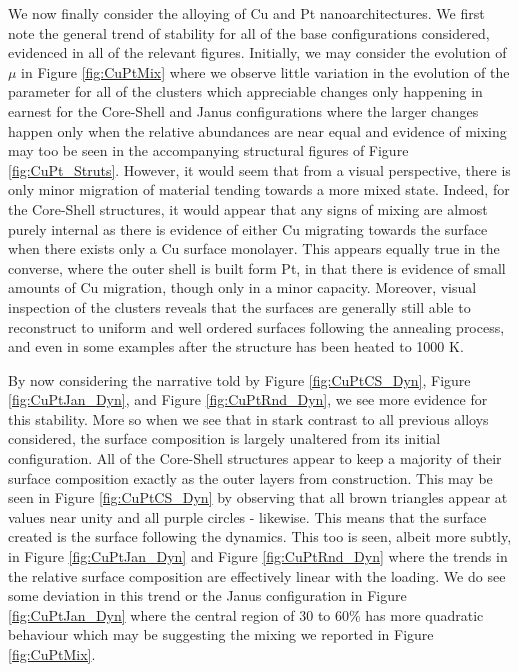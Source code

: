 We now finally consider the alloying of Cu and Pt nanoarchitectures. We first note the general trend of stability for all of the base configurations considered, evidenced in all of the relevant figures. Initially, we may consider the evolution of $\mu$ in Figure \ref{fig:CuPtMix} where we observe little variation in the evolution of the parameter for all of the clusters which appreciable changes only happening in earnest for the Core-Shell and Janus configurations where the larger changes happen only when the relative abundances are near equal and evidence of mixing may too be seen in the accompanying structural figures of Figure \ref{fig:CuPt_Struts}. However, it would seem that from a visual perspective, there is only minor migration of material tending towards a more mixed state. Indeed, for the Core-Shell structures, it would appear that any signs of mixing are almost purely internal as there is evidence of either Cu migrating towards the surface when there exists only a Cu surface monolayer. This appears equally true in the converse, where the outer shell is built form Pt, in that there is evidence of small amounts of Cu migration, though only in a minor capacity. Moreover, visual inspection of the clusters reveals that the surfaces are generally still able to reconstruct to uniform and well ordered surfaces following the annealing process, and even in some examples after the structure has been heated to 1000 K. 

By now considering the narrative told by Figure \ref{fig:CuPtCS_Dyn}, Figure \ref{fig:CuPtJan_Dyn}, and Figure \ref{fig:CuPtRnd_Dyn}, we see more evidence for this stability. More so when we see that in stark contrast to all previous alloys considered, the surface composition is largely unaltered from its initial configuration. All of the Core-Shell structures appear to keep a majority of their surface composition exactly as the outer layers from construction. This may be seen in Figure \ref{fig:CuPtCS_Dyn} by observing that all brown triangles appear at values near unity and all purple circles - likewise. This means that the surface created is the surface following the dynamics. This too is seen, albeit more subtly, in Figure \ref{fig:CuPtJan_Dyn} and Figure \ref{fig:CuPtRnd_Dyn} where the trends in the relative surface composition are effectively linear with the loading. We do see some deviation in this trend or the Janus configuration in Figure \ref{fig:CuPtJan_Dyn} where the central region of 30 to 60\% has more quadratic behaviour which may be suggesting the mixing we reported in Figure \ref{fig:CuPtMix}. 

